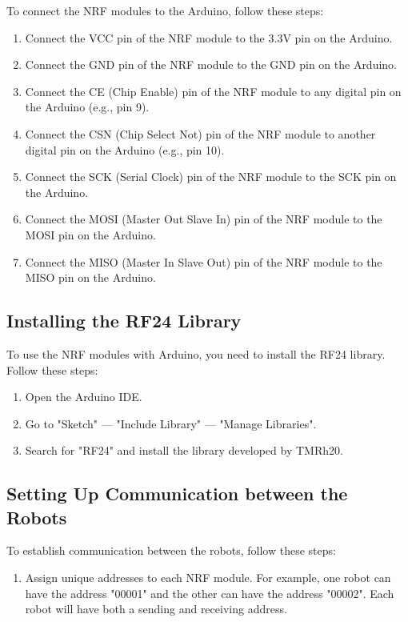 \documentclass[a4paper,12pt,oneside]{book}
\begin{document}
To connect the NRF modules to the Arduino, follow these steps:

\begin{enumerate}
  \item Connect the VCC pin of the NRF module to the 3.3V pin on the Arduino.
  \item Connect the GND pin of the NRF module to the GND pin on the Arduino.
  \item Connect the CE (Chip Enable) pin of the NRF module to any digital pin on the Arduino (e.g., pin 9).
  \item Connect the CSN (Chip Select Not) pin of the NRF module to another digital pin on the Arduino (e.g., pin 10).
  \item Connect the SCK (Serial Clock) pin of the NRF module to the SCK pin on the Arduino.
  \item Connect the MOSI (Master Out Slave In) pin of the NRF module to the MOSI pin on the Arduino.
  \item Connect the MISO (Master In Slave Out) pin of the NRF module to the MISO pin on the Arduino.
\end{enumerate}

\subsection*{Installing the RF24 Library}

To use the NRF modules with Arduino, you need to install the RF24 library. Follow these steps:

\begin{enumerate}
  \item Open the Arduino IDE.
  \item Go to "Sketch" --- "Include Library" --- "Manage Libraries".
  \item Search for "RF24" and install the library developed by TMRh20.
\end{enumerate}

\subsection*{Setting Up Communication between the Robots}

To establish communication between the robots, follow these steps:

\begin{enumerate}
  \item Assign unique addresses to each NRF module. For example, one robot can have the address "00001" and the other can have the address "00002". Each robot will have both a sending and receiving address.
\end{enumerate}
\end{document}
